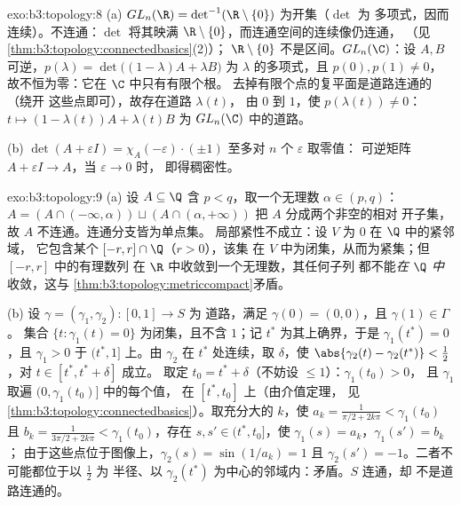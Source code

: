 \begin{solution}{exo:b3:topology:8}
(a) $GL_n(\R) = \det^{-1}(\R\setminus\{0\})$ 为开集（$\det$ 为
多项式，因而连续）。不连通：$\det$ 将其映满
$\R\setminus\{0\}$，而连通空间的连续像仍连通，
（见\cref{thm:b3:topology:connectedbasics}(2)）；
$\R\setminus\{0\}$ 不是区间。$GL_n(\C)$：设 $A, B$
可逆，$p(\lambda) = \det\bigl((1-\lambda)A + \lambda
B\bigr)$ 为 $\lambda$ 的多项式，且 $p(0), p(1) \neq 0$，
故不恒为零：它在 $\C$ 中只有有限个根。
去掉有限个点的复平面是道路连通的（绕开
这些点即可），故存在道路 $\lambda(t)$，
由 $0$ 到 $1$，使 $p(\lambda(t)) \neq 0$：$t \mapsto
(1-\lambda(t))A + \lambda(t)B$ 为 $GL_n(\C)$ 中的道路。

(b) $\det(A + \varepsilon I) = \chi_A(-\varepsilon)\cdot(\pm1)$
至多对 $n$ 个 $\varepsilon$ 取零值：
可逆矩阵 $A + \varepsilon I \to A$，当 $\varepsilon \to 0$ 时，
即得稠密性。
\end{solution}

\begin{solution}{exo:b3:topology:9}
(a) 设 $A \subseteq \Q$ 含 $p < q$，取一个无理数
$\alpha \in (p, q)$：$A = (A \cap (-\infty, \alpha)) \sqcup
(A\cap(\alpha, +\infty))$ 把 $A$ 分成两个非空的相对
开子集，故 $A$ 不连通。连通分支皆为单点集。
局部紧性不成立：设 $V$ 为 $0$ 在 $\Q$ 中的紧邻域，
它包含某个 $[-r, r]\cap\Q$（$r > 0$），该集
在 $V$ 中为闭集，从而为紧集；但 $[-r,r]$ 中的有理数列
在 $\R$ 中收敛到一个无理数，其任何子列
都不能\emph{在 $\Q$ 中}收敛，这与
\cref{thm:b3:topology:metriccompact}矛盾。

(b) 设 $\gamma = (\gamma_1, \gamma_2) \colon [0,1] \to S$ 为
道路，满足 $\gamma(0) = (0,0)$，且 $\gamma(1) \in \Gamma$。
集合 $\{t : \gamma_1(t) = 0\}$ 为闭集，且不含
$1$；记 $t^*$ 为其上确界，于是 $\gamma_1(t^*) = 0$，且
$\gamma_1 > 0$ 于 $(t^*, 1]$ 上。由 $\gamma_2$ 在
$t^*$ 处连续，取 $\delta$，使 $\abs{\gamma_2(t) -
\gamma_2(t^*)} < \tfrac12$，对 $t \in [t^*, t^* + \delta]$ 成立。
取定 $t_0 = t^* + \delta$（不妨设 $\leq 1$）：$\gamma_1(t_0) > 0$，
且 $\gamma_1$ 取遍 $(0, \gamma_1(t_0)]$ 中的每个值，
在 $[t^*, t_0]$ 上（由介值定理，
见\cref{thm:b3:topology:connectedbasics}）。取充分大的 $k$，使
$a_k = \frac1{\pi/2 + 2k\pi} < \gamma_1(t_0)$ 且 $b_k =
\frac1{3\pi/2 + 2k\pi} < \gamma_1(t_0)$，存在 $s, s' \in
(t^*, t_0]$，使 $\gamma_1(s) = a_k$，$\gamma_1(s') = b_k$；
由于这些点位于图像上，$\gamma_2(s) = \sin(1/a_k) =
1$ 且 $\gamma_2(s') = -1$。二者不可能都位于以 $\frac12$ 为
半径、以 $\gamma_2(t^*)$ 为中心的邻域内：矛盾。$S$ 连通，却
不是道路连通的。
\end{solution}

